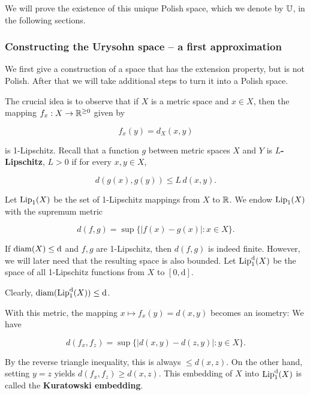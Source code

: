 We will prove the existence of this unique Polish space, which we denote by $\mathbb{U}$, in the following sections.

\subsubsection{Constructing the Urysohn space -- a first approximation}

We first give a construction of a space that has the extension property, but is not Polish. After that we will take additional steps to turn it into a Polish space.

The crucial idea is to observe that if $X$ is a metric space and $x \in X$, then the mapping $f_{x}: X \to \mathbb{R}^{\geq 0}$ given by

\begin{equation}
f_{x}(y) = d_X(x,y)
\end{equation}

is 1-Lipschitz. Recall that a function $g$ between metric spaces $X$ and $Y$  is \textbf{$L$-Lipschitz}, $L > 0$ if for every $x,y \in X$,

\begin{equation}
d(g(x),g(y)) \leq L \, d(x,y).
\end{equation}

Let $\operatorname{Lip}_1(X)$ be the set of 1-Lipschitz mappings from $X$ to $\mathbb{R}$. We endow $\operatorname{Lip}_1(X)$ with the supremum metric

\begin{equation}
d(f,g) = \sup \{|f(x) - g(x)| \colon x \in X \}.
\end{equation}

If $\mathrm{diam}(X) \leq \mathrm{d}$ and $f,g$ are 1-Lipschitz, then $d(f,g)$ is indeed finite.
However, we will later  need that the resulting space is also bounded. Let  $\operatorname{Lip}^{\mathrm{d}}_1(X)$ be the space of all 1-Lipschitz functions from $X$ to $[0,\mathrm{d}]$.

Clearly, $\mathrm{diam}(\operatorname{Lip}^{\mathrm{d}}_1(X)) \leq \mathrm{d}$.

With this metric, the mapping $x \mapsto f_{x}(y) = d(x,y)$ becomes an isometry: We have

\begin{equation}
d(f_{x}, f_{z}) = \sup\{ | d(x,y) - d(z,y)| \colon y \in X \}.
\end{equation}

By the reverse triangle inequality, this is always $\leq d(x,z)$. On the other hand, setting $y=z$ yields $d(f_x,f_z) \geq d(x,z)$. This embedding of $X$ into $\operatorname{Lip}^{\mathrm{d}}_1(X)$ is called the \textbf{Kuratowski embedding}.

